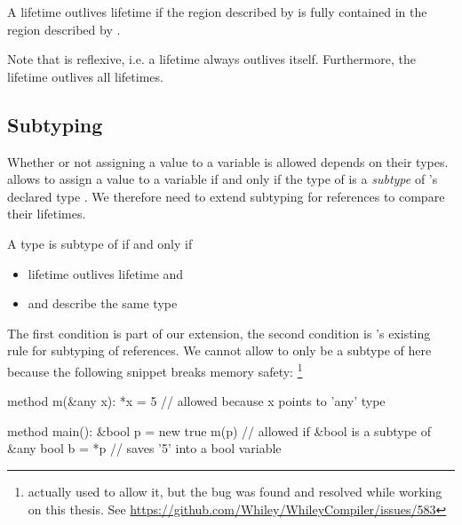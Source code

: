 \begin{definition}\label{definition:outlives}
A lifetime  outlives lifetime  if the region described by  is fully contained in the region described by .
\end{definition}

\noindent Note that  is reflexive, i.e. a lifetime always outlives itself.
Furthermore, the lifetime \whileyinline{*} outlives all lifetimes.


\subsection{Subtyping}\label{section:design-subtyping}

Whether or not assigning a value to a variable is allowed depends on their types.
\whiley allows to assign a value  to a variable  if and only if the type of  is a \emph{subtype} of 's declared type \cite[p. 40]{WLS}.
We therefore need to extend subtyping for references to compare their lifetimes.

\begin{definition}\label{definition:reference-subtype}
A type  is subtype of  if and only if
\begin{itemize}
\item lifetime  outlives lifetime  and
\item {} and  describe the same type
\end{itemize}
\end{definition}

\noindent The first condition is part of our extension, the second condition is \whiley's existing rule for subtyping of references.
We cannot allow  to only be a subtype of  here because the following snippet breaks memory safety:%
\footnote{\whiley actually used to allow it, but the bug was found and resolved while working on this thesis. See \url{https://github.com/Whiley/WhileyCompiler/issues/583}}

\begin{whileycode}
method m(&any x):
	*x = 5 // allowed because x points to 'any' type

method main():
	&bool p = new true
	m(p) // allowed if &bool is a subtype of &any
	bool b = *p // saves '5' into a bool variable
\end{whileycode}

